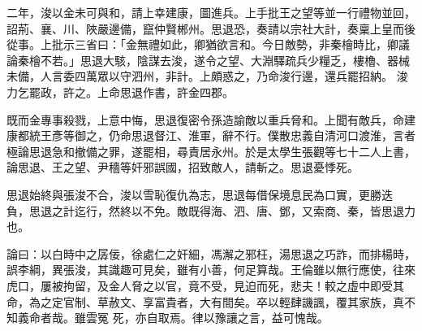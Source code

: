 \begin{pinyinscope}
 二年，浚以金未可與和，請上幸建康，圖進兵。上手批王之望等並一行禮物並回，詔荊、襄、川、陜嚴邊備，竄仲賢郴州。思退恐，奏請以宗社大計，奏稟上皇而後從事。上批示三省曰：「金無禮如此，卿猶欲言和。今日敵勢，非秦檜時比，卿議論秦檜不若。」思退大駭，陰謀去浚，遂令之望、大淵驛疏兵少糧乏，樓櫓、器械未備，人言委四萬眾以守泗州，非計。上頗惑之，乃命浚行邊，還兵罷招納。
 浚力乞罷政，許之。上命思退作書，許金四郡。



 既而金專事殺戮，上意中悔，思退復密令孫造諭敵以重兵脅和。上聞有敵兵，命建康都統王彥等御之，仍命思退督江、淮軍，辭不行。僕散忠義自清河口渡淮，言者極論思退急和撤備之罪，遂罷相，尋責居永州。於是太學生張觀等七十二人上書，論思退、王之望、尹穡等奸邪誤國，招致敵人，請斬之。思退憂悸死。



 思退始終與張浚不合，浚以雪恥復仇為志，思退每借保境息民為口實，更勝迭
 負，思退之計迄行，然終以不免。敵既得海、泗、唐、鄧，又索商、秦，皆思退力也。



 論曰：以白時中之孱佞，徐處仁之奸細，馮澥之邪枉，湯思退之巧詐，而排楊時，誤李綱，異張浚，其識趣可見矣，雖有小善，何足算哉。王倫雖以無行應使，往來虎口，屢被拘留，及金人脅之以官，竟不受，見迫而死，悲夫！較之虛中即受其命，為之定官制、草赦文、享富貴者，大有間矣。卒以輕肆譏諷，覆其家族，真不知義命者哉。雖雲冤
 死，亦自取焉。律以豫讓之言，益可愧哉。



\end{pinyinscope}